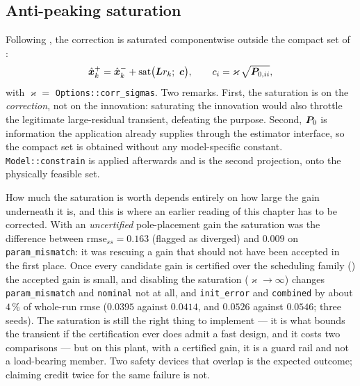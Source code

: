 \subsection{Anti-peaking saturation}
Following \cite{esfandiari1992saturation}, the correction is saturated componentwise outside the
compact set of :
\begin{equation}
\hat{\bm{x}}^{+}_k = \hat{\bm{x}}^{-}_k + \operatorname{sat}\!\big(\bm{L} r_k;\ \bm{c}\big) ,
\qquad c_i = \varkappa\,\sqrt{\bm{P}_{0,ii}} ,
\label{eq:hgo-sat}
\end{equation}
with $\varkappa = $ \texttt{Options::corr\_sigmas}.  Two remarks.  First, the saturation is on the
\emph{correction}, not on the innovation: saturating the innovation would also throttle the
legitimate large-residual transient, defeating the purpose.  Second,
$\bm{P}_0$ is information the application already supplies through the estimator interface, so the
compact set is obtained without any model-specific constant.  \texttt{Model::constrain} is applied
afterwards and is the second projection, onto the physically feasible set.

How much the saturation is worth depends entirely on how large the gain underneath it is, and
this is where an earlier reading of this chapter has to be corrected.  With an \emph{uncertified}
pole-placement gain the saturation was the difference between $\mathrm{rmse}_{ss}=0.163$ (flagged
as diverged) and $0.009$ on \texttt{param\_mismatch}: it was rescuing a gain that should not have
been accepted in the first place.  Once every candidate gain is certified over the scheduling
family () the accepted gain is small, and disabling the saturation
($\varkappa\to\infty$) changes \texttt{param\_mismatch} and \texttt{nominal} not at all, and
\texttt{init\_error} and \texttt{combined} by about $4\,\%$ of whole-run rmse ($0.0395$ against
$0.0414$, and $0.0526$ against $0.0546$; three seeds).  The saturation is still the right thing to
implement --- it is what bounds the transient if the certification ever does admit a fast design,
and it costs two comparisons --- but on this plant, with a certified gain, it is a guard rail and
not a load-bearing member.  Two safety devices that overlap is the expected outcome; claiming
credit twice for the same failure is not.

